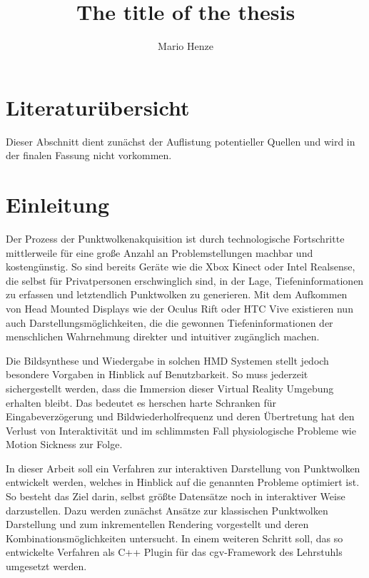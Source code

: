 \documentclass[hyperref, beleg, german]{cgvpub}
\author{Mario Henze}
\title{The title of the thesis}
\begin{document}
\section{Literaturübersicht}

Dieser Abschnitt dient zunächst der Auflistung potentieller Quellen und wird in
der finalen Fassung nicht vorkommen.

\begin{description}
	\item[\cite{discher2018point}]
	\item[\cite{rusinkiewicz2000qsplat}]
	\item[\cite{goswami2010high}]
	\item[\cite{wimmer2006instant}]
	\item[\cite{shum2000review}]
	\item[\cite{mark1997post}]
	\item[\cite{mcmillan1995head}]
	\item[\cite{chang1999ldi}]
	\item[\cite{he1998layered}]
\end{description}

\section{Einleitung}
\label{sec:einleitung}

Der Prozess der Punktwolkenakquisition ist durch technologische Fortschritte
mittlerweile für eine große Anzahl an Problemstellungen machbar und
kostengünstig. So sind bereits Geräte wie die Xbox Kinect oder Intel
Realsense, die selbst für Privatpersonen erschwinglich sind, in der Lage,
Tiefeninformationen zu erfassen und letztendlich Punktwolken zu generieren. Mit
dem Aufkommen von Head Mounted Displays wie der Oculus Rift oder HTC Vive
existieren nun auch Darstellungsmöglichkeiten, die die gewonnen
Tiefeninformationen der menschlichen Wahrnehmung direkter und intuitiver
zugänglich machen.

Die Bildsynthese und Wiedergabe in solchen HMD Systemen stellt jedoch besondere
Vorgaben in Hinblick auf Benutzbarkeit. So muss jederzeit sichergestellt werden,
dass die Immersion dieser Virtual Reality Umgebung erhalten bleibt. Das bedeutet
es herschen harte Schranken für Eingabeverzögerung und Bildwiederholfrequenz und
deren Übertretung hat den Verlust von Interaktivität und im schlimmsten Fall
physiologische Probleme wie Motion Sickness zur Folge.

In dieser Arbeit soll ein Verfahren zur interaktiven Darstellung von Punktwolken
entwickelt werden, welches in Hinblick auf die genannten Probleme optimiert ist.
So besteht das Ziel darin, selbst größte Datensätze noch in interaktiver Weise
darzustellen. Dazu werden zunächst Ansätze zur klassischen Punktwolken
Darstellung und zum inkrementellen Rendering vorgestellt und deren
Kombinationsmöglichkeiten untersucht. In einem weiteren Schritt soll, das so
entwickelte Verfahren als C++ Plugin für das cgv-Framework des Lehrstuhls
umgesetzt werden.
\end{document}
